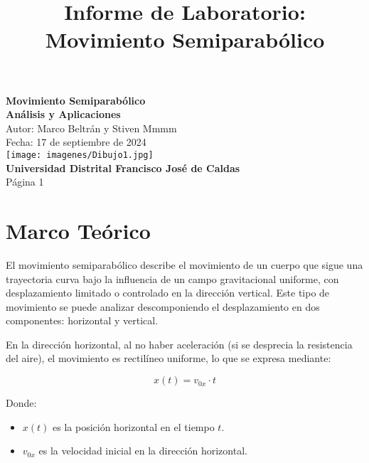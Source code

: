 \documentclass[a4paper,12pt]{article}
\begin{document}
\begin{titlepage}
    \centering
    \vspace*{2cm}

    {\Huge \textbf{Movimiento Semiparabólico}} \\[1.5cm]

    {\Large \textbf{Análisis y Aplicaciones}} \\[1.5cm]

    {\large Autor: Marco Beltrán y Stiven Mmmm} \\[0.5cm]

    {\large Fecha: 17 de septiembre de 2024} \\[2cm]

    \texttt{[image: imagenes/Dibujo1.jpg]} \\[1cm]

    {\large \textbf{Universidad Distrital Francisco José de Caldas}} \\[0.5cm]

    \vfill
    {\large Página 1}
\end{titlepage}

\title{Informe de Laboratorio: Movimiento Semiparabólico}
\author{}
\date{}
\maketitle

\section{Marco Teórico}
El movimiento semiparabólico describe el movimiento de un cuerpo que sigue una trayectoria curva bajo la influencia de un campo gravitacional uniforme, con desplazamiento limitado o controlado en la dirección vertical. Este tipo de movimiento se puede analizar descomponiendo el desplazamiento en dos componentes: horizontal y vertical.

En la dirección horizontal, al no haber aceleración (si se desprecia la resistencia del aire), el movimiento es rectilíneo uniforme, lo que se expresa mediante:

\[
x(t) = v_{0x} \cdot t
\]

Donde:
\begin{itemize}
    \item $x(t)$ es la posición horizontal en el tiempo $t$.
    \item $v_{0x}$ es la velocidad inicial en la dirección horizontal.
\end{itemize}
\end{document}
